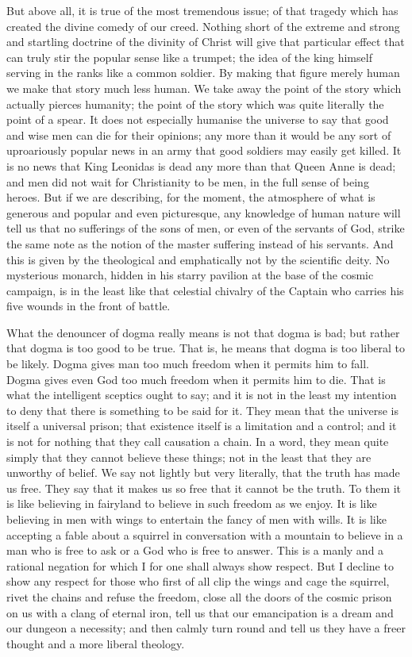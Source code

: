 But above all, it is true of the most tremendous issue; of that tragedy which has created the divine comedy of our creed. Nothing short of the extreme and strong and startling doctrine of the divinity of Christ will give that particular effect that can truly stir the popular sense like a trumpet; the idea of the king himself serving in the ranks like a common soldier. By making that figure merely human we make that story much less human. We take away the point of the story which actually pierces humanity; the point of the story which was quite literally the point of a spear. It does not especially humanise the universe to say that good and wise men can die for their opinions; any more than it would be any sort of uproariously popular news in an army that good soldiers may easily get killed. It is no news that King Leonidas is dead any more than that Queen Anne is dead; and men did not wait for Christianity to be men, in the full sense of being heroes. But if we are describing, for the moment, the atmosphere of what is generous and popular and even picturesque, any knowledge of human nature will tell us that no sufferings of the sons of men, or even of the servants of God, strike the same note as the notion of the master suffering instead of his servants. And this is given by the theological and emphatically not by the scientific deity. No mysterious monarch, hidden in his starry pavilion at the base of the cosmic campaign, is in the least like that celestial chivalry of the Captain who carries his five wounds in the front of battle.

What the denouncer of dogma really means is not that dogma is bad; but rather that dogma is too good to be true. That is, he means that dogma is too liberal to be likely. Dogma gives man too much freedom when it permits him to fall. Dogma gives even God too much freedom when it permits him to die. That is what the intelligent sceptics ought to say; and it is not in the least my intention to deny that there is something to be said for it. They mean that the universe is itself a universal prison; that existence itself is a limitation and a control; and it is not for nothing that they call causation a chain. In a word, they mean quite simply that they cannot believe these things; not in the least that they are unworthy of belief. We say not lightly but very literally, that the truth has made us free. They say that it makes us so free that it cannot be the truth. To them it is like believing in fairyland to believe in such freedom as we enjoy. It is like believing in men with wings to entertain the fancy of men with wills. It is like accepting a fable about a squirrel in conversation with a mountain to believe in a man who is free to ask or a God who is free to answer. This is a manly and a rational negation for which I for one shall always show respect. But I decline to show any respect for those who first of all clip the wings and cage the squirrel, rivet the chains and refuse the freedom, close all the doors of the cosmic prison on us with a clang of eternal iron, tell us that our emancipation is a dream and our dungeon a necessity; and then calmly turn round and tell us they have a freer thought and a more liberal theology.

